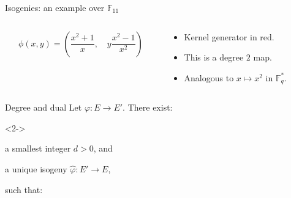 \documentclass[aspectratio=169]{beamer}
\newcommand{\F}{\mathbb{F}}
\begin{document}
\begin{frame}{Isogenies: an example over $\F_{11}$}
  \begin{columns}
    \begin{column}{0.5\textwidth}
      \[\phi(x,y) = \left(\frac{x^2 + 1}{x},\quad y\frac{x^2-1}{x^2}\right)\]
    \end{column}
    \begin{column}{0.5\textwidth}
      \begin{itemize}
      \item<2-> Kernel generator in \alert{red}.
      \item<2-> This is a degree $2$ map.
      \item<2-> Analogous to $x\mapsto x^2$ in $\F_q^*$.
      \end{itemize}
    \end{column}
  \end{columns}
\end{frame}


\begin{frame}{Degree and dual}
  \large
  Let \emph{$φ : E \to E'$}. There exist:

  \smallskip
  \begin{uncoverenv}<2->
    \begin{description}
    \item[Degree:] a smallest integer \emph{$d > 0$}, and
    \item[Dual:] a unique isogeny \emph{$\widehat{φ} : E' \to E$},
    \item<3-> such that:
    \end{description}
  \end{uncoverenv}
  
  \medskip
  \centering
\end{frame}

\end{document}
